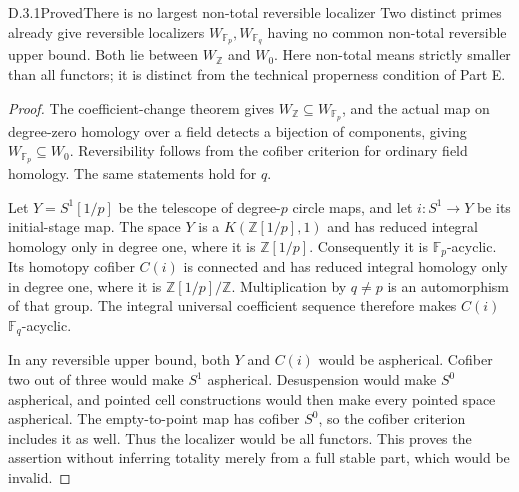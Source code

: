













\begin{claim}{D.3.1}{Proved}{There is no largest non-total reversible localizer}
Two distinct primes already give reversible localizers $W_{\mathbb F_p},W_{\mathbb F_q}$ having no common non-total reversible upper bound. Both lie between $W_{\mathbb Z}$ and $W_0$. Here non-total means strictly smaller than all functors; it is distinct from the technical properness condition of Part E.
\end{claim}
\begin{proof}
The coefficient-change theorem gives $W_{\mathbb Z}\subseteq W_{\mathbb F_p}$, and the actual map on degree-zero homology over a field detects a bijection of components, giving $W_{\mathbb F_p}\subseteq W_0$. Reversibility follows from the cofiber criterion for ordinary field homology. The same statements hold for $q$.

Let $Y=S^1[1/p]$ be the telescope of degree-$p$ circle maps, and let $i:S^1\to Y$ be its initial-stage map. The space $Y$ is a $K(\mathbb Z[1/p],1)$ and has reduced integral homology only in degree one, where it is $\mathbb Z[1/p]$. Consequently it is $\mathbb F_p$-acyclic. Its homotopy cofiber $C(i)$ is connected and has reduced integral homology only in degree one, where it is $\mathbb Z[1/p]/\mathbb Z$. Multiplication by $q\neq p$ is an automorphism of that group. The integral universal coefficient sequence therefore makes $C(i)$ $\mathbb F_q$-acyclic.

In any reversible upper bound, both $Y$ and $C(i)$ would be aspherical. Cofiber two out of three would make $S^1$ aspherical. Desuspension would make $S^0$ aspherical, and pointed cell constructions would then make every pointed space aspherical. The empty-to-point map has cofiber $S^0$, so the cofiber criterion includes it as well. Thus the localizer would be all functors. This proves the assertion without inferring totality merely from a full stable part, which would be invalid.
\end{proof}

